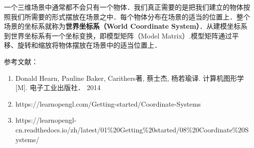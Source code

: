 

一个三维场景中通常都不会只有一个物体．我们真正需要的是把我们建立的物体按照我们所需要的形式摆放在场景之中．每个物体分布在场景的适当的位置上．整个场景的坐标系就称为\textbf{世界坐标系（World Coordinate System）}．从建模坐标系到世界坐标系有一个坐标变换，即模型矩阵（Model Matrix）.模型矩阵通过平移、旋转和缩放将物体摆放在场景中的适当位置上．



参考文献：
\begin{enumerate}
\item Donald Hearn, Pauline Baker, Carithers著, 蔡士杰, 杨若瑜译. 计算机图形学[M]. 电子工业出版社． 2014
\item https://learnopengl.com/Getting-started/Coordinate-Systems
\item https://learnopengl-cn.readthedocs.io/zh/latest/01\%20Getting\%20started/08\%20Coordinate\%20Systems/
\end{enumerate}